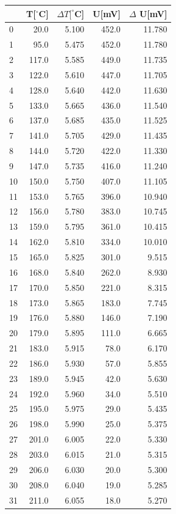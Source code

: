 \documentclass[a4paper,10pt]{article}
\begin{document}
\begin{tabular}{lrrrr}
\hline
{} &T[$^\circ$C]&$\Delta T[^\circ$C]&U[mV]&$\Delta$ U[mV]\\
\hline
0  &   20.0 &  5.100 &  452.0 &  11.780 \\
1  &   95.0 &  5.475 &  452.0 &  11.780 \\
2  &  117.0 &  5.585 &  449.0 &  11.735 \\
3  &  122.0 &  5.610 &  447.0 &  11.705 \\
4  &  128.0 &  5.640 &  442.0 &  11.630 \\
5  &  133.0 &  5.665 &  436.0 &  11.540 \\
6  &  137.0 &  5.685 &  435.0 &  11.525 \\
7  &  141.0 &  5.705 &  429.0 &  11.435 \\
8  &  144.0 &  5.720 &  422.0 &  11.330 \\
9  &  147.0 &  5.735 &  416.0 &  11.240 \\
10 &  150.0 &  5.750 &  407.0 &  11.105 \\
11 &  153.0 &  5.765 &  396.0 &  10.940 \\
12 &  156.0 &  5.780 &  383.0 &  10.745 \\
13 &  159.0 &  5.795 &  361.0 &  10.415 \\
14 &  162.0 &  5.810 &  334.0 &  10.010 \\
15 &  165.0 &  5.825 &  301.0 &   9.515 \\
16 &  168.0 &  5.840 &  262.0 &   8.930 \\
17 &  170.0 &  5.850 &  221.0 &   8.315 \\
18 &  173.0 &  5.865 &  183.0 &   7.745 \\
19 &  176.0 &  5.880 &  146.0 &   7.190 \\
20 &  179.0 &  5.895 &  111.0 &   6.665 \\
21 &  183.0 &  5.915 &   78.0 &   6.170 \\
22 &  186.0 &  5.930 &   57.0 &   5.855 \\
23 &  189.0 &  5.945 &   42.0 &   5.630 \\
24 &  192.0 &  5.960 &   34.0 &   5.510 \\
25 &  195.0 &  5.975 &   29.0 &   5.435 \\
26 &  198.0 &  5.990 &   25.0 &   5.375 \\
27 &  201.0 &  6.005 &   22.0 &   5.330 \\
28 &  203.0 &  6.015 &   21.0 &   5.315 \\
29 &  206.0 &  6.030 &   20.0 &   5.300 \\
30 &  208.0 &  6.040 &   19.0 &   5.285 \\
31 &  211.0 &  6.055 &   18.0 &   5.270 \\
\hline
\end{tabular}
\end{document}
